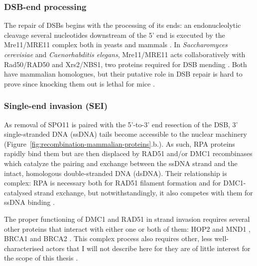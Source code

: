 \subsubsection{DSB-end processing}
The repair of DSBs begins with the processing of its ends: an endonucleolytic cleavage several nucleotides downstream of the 5' end \citep{neale2005endonucleolytic} is executed by the Mre11/MRE11 complex both in yeasts \citep[reviewed in][]{borde2009double} and mammals \citep[reviewed in][]{borde2007multiple}.
In \textit{Saccharomyces cerevisiae} and \textit{Caenorhabditis elegans}, Mre11/MRE11 acts collaboratively with Rad50/RAD50 and Xrs2/NBS1, two proteins required for DSB mending \citep[reviewed in][]{lam2015mechanism}. 
Both have mammalian homologues, but their putative role in DSB repair \citep[reviewed in][]{baudat2013meiotic} is hard to prove since knocking them out is lethal for mice \citep{luo1999disruption,zhu2001targeted}.



\subsubsection{Single-end invasion (SEI)}
As removal of SPO11 is paired with the 5’-to-3’ end resection of the DSB, 3’ single-stranded DNA (ssDNA) tails become accessible to the nuclear machinery (Figure~\ref{fig:recombination-mammalian-proteins}.b.).
As such, RPA proteins rapidly bind them \citep{he1995rpa} but are then displaced by RAD51 and/or DMC1 recombinases \citep{pittman1998meiotic,yoshida1998mouse} which catalyze the pairing and exchange between the ssDNA strand and the intact, homologous double-stranded DNA (dsDNA).
Their relationship is complex: RPA is necessary both for RAD51 filament formation and for DMC1-catalysed strand exchange, but notwithstandingly, it also competes with them for ssDNA binding \citep{sung2003rad51}.

The proper functioning of DMC1 and RAD51 in strand invasion requires several other proteins that interact with either one or both of them: HOP2 and MND1 \citep{bugreev2014hop2mnd1}, BRCA1 \citep{scully1997association} and BRCA2 \citep{thorslund2007interactions}.
This complex process also requires other, less well-characterised actors that I will not describe here for they are of little interest for the scope of this thesis \citep[but for review, see][and Figure~\ref{fig:recombination-mammalian-proteins}.c.]{neale2006clarifying}.


